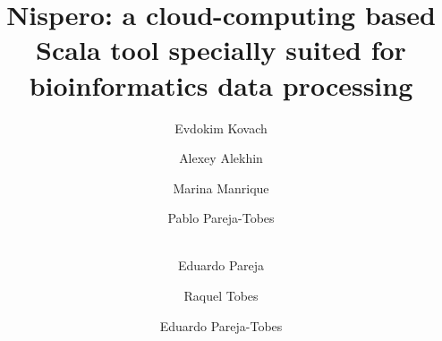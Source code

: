 \documentclass[a4paper]{llncs}
\begin{document}
\mainmatter  %

\title{Nispero: a cloud-computing based Scala tool specially suited for bioinformatics data processing}


%
%
\author{Evdokim Kovach%
\and Alexey Alekhin\and Marina Manrique\and Pablo Pareja-Tobes\and\\ %
Eduardo Pareja\and Raquel Tobes\and Eduardo Pareja-Tobes%
}
%


%
%

\maketitle
\end{document}
